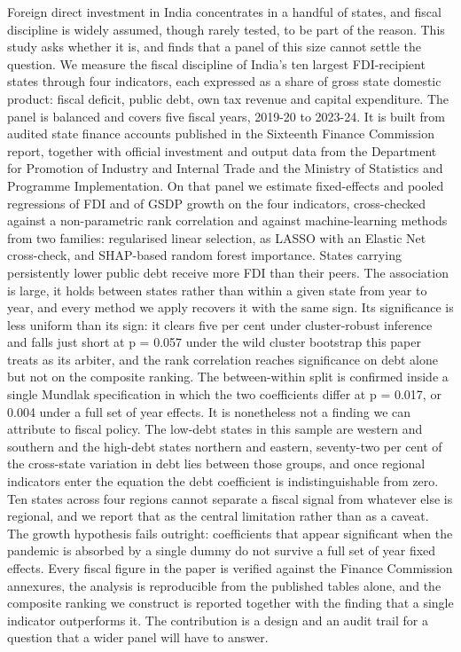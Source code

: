 \documentclass[12pt,a4paper]{article}
\begin{document}
Foreign direct investment in India concentrates in a handful of states, and fiscal discipline is widely assumed, though rarely tested, to be part of the reason. This study asks whether it is, and finds that a panel of this size cannot settle the question. We measure the fiscal discipline of India's ten largest FDI-recipient states through four indicators, each expressed as a share of gross state domestic product: fiscal deficit, public debt, own tax revenue and capital expenditure. The panel is balanced and covers five fiscal years, 2019-20 to 2023-24. It is built from audited state finance accounts published in the Sixteenth Finance Commission report, together with official investment and output data from the Department for Promotion of Industry and Internal Trade and the Ministry of Statistics and Programme Implementation. On that panel we estimate fixed-effects and pooled regressions of FDI and of GSDP growth on the four indicators, cross-checked against a non-parametric rank correlation and against machine-learning methods from two families: regularised linear selection, as LASSO with an Elastic Net cross-check, and SHAP-based random forest importance. States carrying persistently lower public debt receive more FDI than their peers. The association is large, it holds between states rather than within a given state from year to year, and every method we apply recovers it with the same sign. Its significance is less uniform than its sign: it clears five per cent under cluster-robust inference and falls just short at p = 0.057 under the wild cluster bootstrap this paper treats as its arbiter, and the rank correlation reaches significance on debt alone but not on the composite ranking. The between-within split is confirmed inside a single Mundlak specification in which the two coefficients differ at p = 0.017, or 0.004 under a full set of year effects. It is nonetheless not a finding we can attribute to fiscal policy. The low-debt states in this sample are western and southern and the high-debt states northern and eastern, seventy-two per cent of the cross-state variation in debt lies between those groups, and once regional indicators enter the equation the debt coefficient is indistinguishable from zero. Ten states across four regions cannot separate a fiscal signal from whatever else is regional, and we report that as the central limitation rather than as a caveat. The growth hypothesis fails outright: coefficients that appear significant when the pandemic is absorbed by a single dummy do not survive a full set of year fixed effects. Every fiscal figure in the paper is verified against the Finance Commission annexures, the analysis is reproducible from the published tables alone, and the composite ranking we construct is reported together with the finding that a single indicator outperforms it. The contribution is a design and an audit trail for a question that a wider panel will have to answer.
\end{document}

